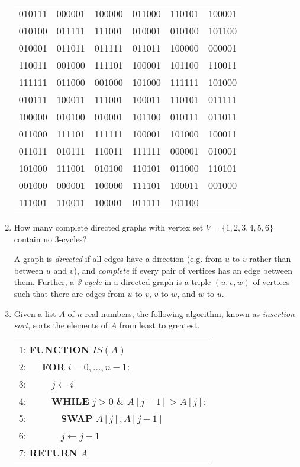 \documentclass[10pt]{article}
\begin{document}
\begin{enumerate}
\begin{center}
\begin{tabular}{cccccc}
010111 & 000001 & 100000 & 011000 & 110101 & 100001 \\
010100 & 011111 & 111001 & 010001 & 010100 & 101100 \\
010001 & 011011 & 011111 & 011011 & 100000 & 000001 \\
110011 & 001000 & 111101 & 100001 & 101100 & 110011 \\
111111 & 011000 & 001000 & 101000 & 111111 & 101000 \\
010111 & 100011 & 111001 & 100011 & 110101 & 011111 \\
100000 & 010100 & 010001 & 101100 & 010111 & 011011 \\
011000 & 111101 & 111111 & 100001 & 101000 & 100011 \\
011011 & 010111 & 110011 & 111111 & 000001 & 010001 \\
101000 & 111001 & 010100 & 110101 & 011000 & 110101 \\
001000 & 000001 & 100000 & 111101 & 100011 & 001000 \\
111001 & 110011 & 100001 & 011111 & 101100 
\end{tabular}
\end{center}




\item How many complete directed graphs with vertex set $V=\{1,2,3,4,5,6\}$ contain no $3$-cycles?

\par A graph is \textit{directed} if all edges have a direction (e.g. from $u$ to $v$ rather than between $u$ and $v$), and \textit{complete} if every pair of vertices has an edge between them. Further, a \textit{3-cycle} in a directed graph is a triple $(u,v,w)$ of vertices such that there are edges from $u$ to $v$, $v$ to $w$, and $w$ to $u$.


\newpage
\item Given a list $A$ of $n$ real numbers, the following algorithm, known as \textit{insertion sort}, sorts the elements of $A$ from least to greatest.

	\begin{tabular}{l}
		1: \textbf{FUNCTION} $IS(A)$ \\
		2: $\quad$ \textbf{FOR} $i=0,\ldots, n-1$: \\
		3: $\quad\quad$ $j \leftarrow i$\\
		4: $\quad\quad$ \textbf{WHILE} $j>0$ \& $A[j-1]>A[j]:$\\
		5: $\quad\quad\quad$ \textbf{SWAP} $A[j], A[j-1]$\\
		6: $\quad\quad\quad$ $j \leftarrow j-1$\\
		7: \textbf{RETURN} $A$
	\end{tabular}


\end{enumerate}
\end{document}
